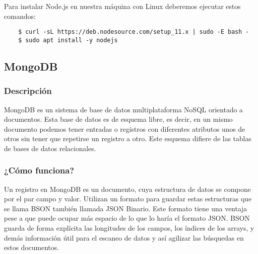 Para instalar Node.js en nuestra máquina con Linux deberemos ejecutar estos comandos:
\begin{lstlisting}
    $ curl -sL https://deb.nodesource.com/setup_11.x | sudo -E bash -
    $ sudo apt install -y nodejs
\end{lstlisting}




\subsection{MongoDB}

\subsubsection{ Descripción }

MongoDB  \cite{URL::MongoDB} es un sistema de base de datos multiplataforma NoSQL   \cite{URL::NoSQL} orientado a documentos. Esta base de datos es de esquema libre, es decir, en un mismo documento podemos tener entradas o registros con diferentes atributos unos de otros sin tener que repetirse un registro a otro. Este esquema difiere de las tablas de bases de datos relacionales.

\subsubsection{ ¿Cómo funciona? }

Un registro en MongoDB es un documento, cuya estructura de datos se compone por el par campo y valor. Utilizan un formato para guardar estas estructuras que se llama BSON  \cite{URL::BSON} también llamada JSON \cite{URL::json} Binario. Este formato tiene una ventaja pese a que puede ocupar más espacio de lo que lo haría el formato JSON. BSON guarda de forma explícita las longitudes de los campos, los índices de los arrays, y demás información útil para el escaneo de datos y así agilizar las búsquedas en estos documentos.


